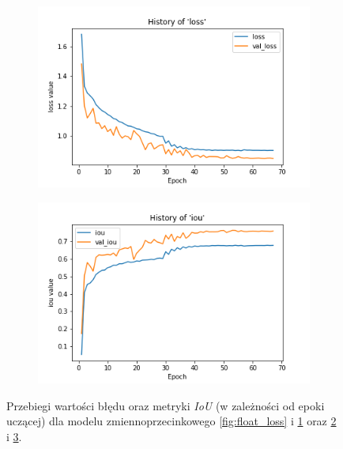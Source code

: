 \begin{figure}
\begin{subfigure}[b]{0.49\textwidth}
         \caption{}
         \label{fig:float_iou}
     \end{subfigure}
     \hfill
     \begin{subfigure}[b]{0.49\textwidth}
         \centering
         \includegraphics[width=\textwidth]{images/8_bit_quant_hist_of_loss.png}
         \caption{}
         \label{fig:quant_loss}
     \end{subfigure}
     \hfill
     \begin{subfigure}[b]{0.49\textwidth}
         \centering
         \includegraphics[width=\textwidth]{images/8_bit_quant_hist_of_iou.png}
         \caption{}
         \label{fig:quant_iou}
     \end{subfigure}
     \hfill
     
    \caption{Przebiegi wartości błędu oraz metryki \emph{IoU} (w zależności od epoki uczącej) dla modelu zmiennoprzecinkowego \ref{fig:float_loss} i \ref{fig:float_iou} oraz \ref{fig:quant_loss} i \ref{fig:quant_iou}.}
    \label{fig:two_step_train}
\end{figure}


